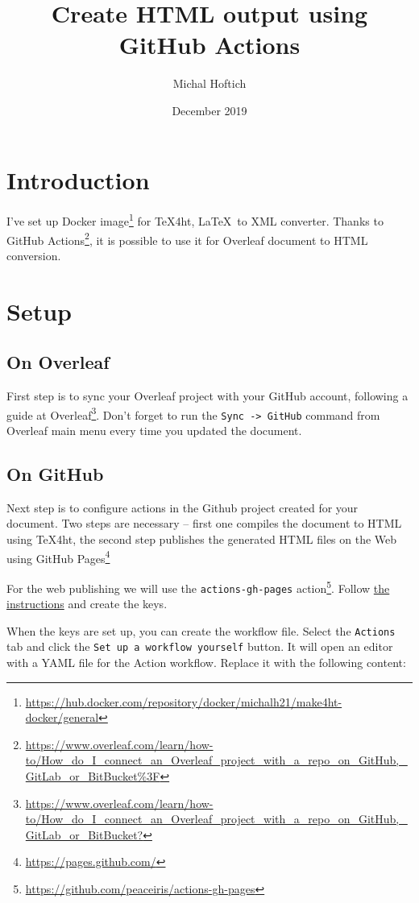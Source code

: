\documentclass{article}
\title{Create HTML output using GitHub Actions}
\author{Michal Hoftich}
\date{December 2019}
\newcommand{\cmdname}[1]{\texttt{#1}}
\newcommand\footurl[1]{\footnote{\url{#1}}}
\begin{document}
\maketitle

\section{Introduction}

I've set up Docker image\footurl{https://hub.docker.com/repository/docker/michalh21/make4ht-docker/general} for \TeX4ht, \LaTeX\ to XML converter. Thanks to GitHub 
Actions\footurl{https://www.overleaf.com/learn/how-to/How_do_I_connect_an_Overleaf_project_with_a_repo_on_GitHub,_GitLab_or_BitBucket\%3F}, it is possible to use it for Overleaf document to HTML conversion.

\section{Setup}

\subsection{On Overleaf}

First step is to sync your Overleaf project with your GitHub account, following a guide at Overleaf\footurl{https://www.overleaf.com/learn/how-to/How_do_I_connect_an_Overleaf_project_with_a_repo_on_GitHub,_GitLab_or_BitBucket?}. Don't forget to run the \cmdname{Sync -> GitHub} command from Overleaf main menu every time you updated the document.

\subsection{On GitHub}
Next step is to configure actions in the Github project created for your document. Two steps are necessary -- first  one compiles the document to HTML using \TeX4ht, the second step publishes the generated HTML files on the Web using GitHub Pages\footurl{https://pages.github.com/}

For the web publishing we will use the \verb|actions-gh-pages| action\footurl{https://github.com/peaceiris/actions-gh-pages}. Follow \href{https://github.com/peaceiris/actions-gh-pages\#1-add-ssh-deploy-key}{the instructions} and create the keys.

When the keys are set up, you can create the workflow file. Select the \cmdname{Actions} tab and click the \cmdname{Set up a workflow yourself} button. It will open an editor with a YAML file for the Action workflow. Replace it with the following content:
\end{document}
